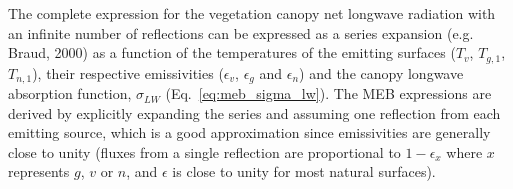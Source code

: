 
%


The complete expression for the vegetation canopy net longwave radiation 
with an infinite number of reflections can be expressed as a
series expansion 
(e.g. Braud, 2000\nocite{braud_00}) 
as a function of the
temperatures of the emitting surfaces ($T_v$, $T_{g,1}$, 
$T_{n,1}$), their respective emissivities
($\epsilon_v$, $\epsilon_g$ and $\epsilon_n$) and the canopy longwave
absorption function,
$\sigma_{LW}$ (Eq.~\ref{eq:meb_sigma_lw}).
%
The MEB expressions are derived by explicitly expanding
the series 
%
and assuming one reflection from each emitting source, which is
a good approximation since emissivities are generally close to unity
(fluxes from a single reflection are proportional to $1-\epsilon_x$ where $x$ represents
$g$, $v$ or $n$, and $\epsilon$ is close
to unity for most natural surfaces).

